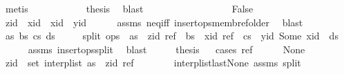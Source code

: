 \begin{isabellebody}
\ metis\isanewline
\ \ \ \ \ \ \ \ \isamarkupfalse%
\ \isamarkupfalse%
\ {\isacharquery}thesis\ \isamarkupfalse%
\ blast\isanewline
\ \ \ \ \ \ \isamarkupfalse%
\isanewline
\ \ \ \ \isamarkupfalse%
\isanewline
\ \ \isamarkupfalse%
\isanewline
{}\isamarkupfalse%
\isanewline
\ \ \isamarkupfalse%
\ False\isanewline
\ \ \isamarkupfalse%
\ {\isachardoublequoteopen}zid\ {\isacharless}\ xid{\isachardoublequoteclose}\ \ {\isachardoublequoteopen}xid\ {\isacharless}\ yid{\isachardoublequoteclose}\isanewline
\ \ \ \ \isamarkupfalse%
\ assms\ neq{\isacharunderscore}iff\ insert{\isacharunderscore}ops{\isacharunderscore}memb{\isacharunderscore}ref{\isacharunderscore}older\ \isamarkupfalse%
\ blast{\isacharplus}\isanewline
\ \ \isamarkupfalse%
\ \isamarkupfalse%
\ as\ bs\ cs\ ds\isanewline
\ \ \ \ \ split{\isacharcolon}\ {\isachardoublequoteopen}ops\ {\isacharequal}\ as\ {\isacharat}\ {\isacharbrackleft}{\isacharparenleft}zid{\isacharcomma}\ ref{\isacharparenright}{\isacharbrackright}\ {\isacharat}\ bs\ {\isacharat}\ {\isacharbrackleft}{\isacharparenleft}xid{\isacharcomma}\ ref{\isacharparenright}{\isacharbrackright}\ {\isacharat}\ cs\ {\isacharat}\ {\isacharbrackleft}{\isacharparenleft}yid{\isacharcomma}\ Some\ xid{\isacharparenright}{\isacharbrackright}\ {\isacharat}\ ds{\isachardoublequoteclose}\isanewline
\ \ \ \ \isamarkupfalse%
\ assms\ insert{\isacharunderscore}ops{\isacharunderscore}split{\isacharunderscore}{}\ \isamarkupfalse%
\ blast\isanewline
\ \ \isamarkupfalse%
\ \isamarkupfalse%
\ {\isacharquery}thesis\isanewline
\ \ \isamarkupfalse%
{\isacharparenleft}cases\ ref{\isacharparenright}\isanewline
\ \ \ \ \isamarkupfalse%
\ None\isanewline
\ \ \ \ \isamarkupfalse%
\ {\isachardoublequoteopen}zid\ {\isasymin}\ set\ {\isacharparenleft}interp{\isacharunderscore}list\ {\isacharparenleft}as\ {\isacharat}\ {\isacharbrackleft}{\isacharparenleft}zid{\isacharcomma}\ ref{\isacharparenright}{\isacharbrackright}{\isacharparenright}{\isacharparenright}{\isachardoublequoteclose}\isanewline
\ \ \ \ \ \ \isamarkupfalse%
\ interp{\isacharunderscore}list{\isacharunderscore}last{\isacharunderscore}None\ assms{\isacharparenleft}{}{\isacharparenright}\ split\ \isamarkupfalse%

\end{isabellebody}
